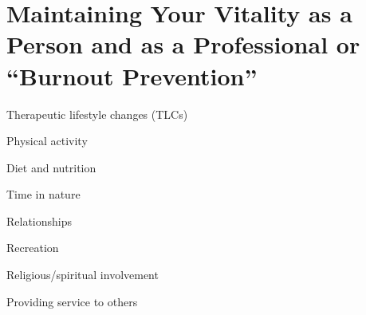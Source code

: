 \section{Maintaining Your Vitality as a Person and as a Professional or ``Burnout Prevention''}

\begin{coloredlist}
    \item Therapeutic lifestyle changes (TLCs)
    \begin{coloredlist}
        \item Physical activity
        \item Diet and nutrition
        \item Time in nature
        \item Relationships
        \item Recreation
        \item Religious/spiritual involvement
        \item Providing service to others
    \end{coloredlist}
\end{coloredlist}